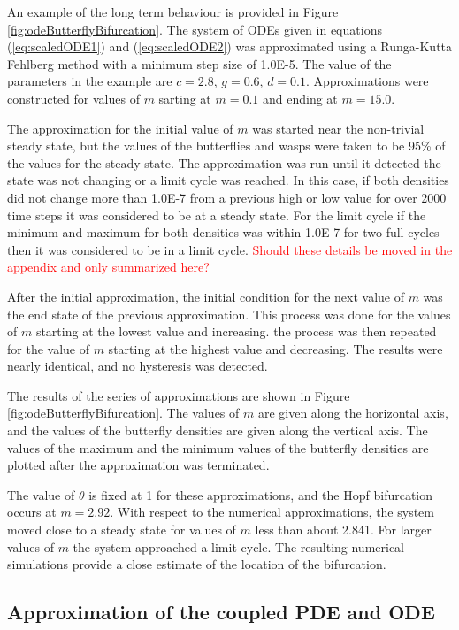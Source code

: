 \documentclass[review]{elsarticle}
\begin{document}
An example of the long term behaviour is provided in Figure
\ref{fig:odeButterflyBifurcation}. The system of ODEs given in
equations (\ref{eq:scaledODE1}) and (\ref{eq:scaledODE2}) was
approximated using a Runga-Kutta Fehlberg method with a minimum step
size of 1.0E-5.  The value of the parameters in the example are
$c=2.8$, $g=0.6$, $d=0.1$. Approximations were constructed for values
of $m$ sarting at $m=0.1$ and ending at $m=15.0$.

The approximation for the initial value of $m$ was started near the
non-trivial steady state, but the values of the butterflies and wasps
were taken to be 95\% of the values for the steady state. The
approximation was run until it detected the state was not changing or
a limit cycle was reached. In this case, if both densities did not
change more than 1.0E-7 from a previous high or low value for over
2000 time steps it was considered to be at a steady state. For the
limit cycle if the minimum and maximum for both densities was within
1.0E-7 for two full cycles then it was considered to be in a limit
cycle. \textcolor{red}{Should these details be moved in the appendix and only summarized here?}

After the initial approximation, the initial condition for the next
value of $m$ was the end state of the previous approximation. This
process was done for the values of $m$ starting at the lowest value
and increasing. the process was then repeated for the value of $m$
starting at the highest value and decreasing. The results were nearly
identical, and no hysteresis was detected.

The results of the series of approximations are shown in Figure
\ref{fig:odeButterflyBifurcation}. The values of $m$ are given along
the horizontal axis, and the values of the butterfly densities are
given along the vertical axis. The values of the maximum and the
minimum values of the butterfly densities are plotted after the
approximation was terminated.

The value of $\theta$ is fixed at 1 for these approximations, and the Hopf bifurcation occurs at $m=2.92$. With respect to the numerical approximations, the system moved close to a steady state for values of $m$ less than about 2.841. For larger values of $m$ the system approached a limit
cycle. The resulting numerical simulations provide a close estimate of the location of the bifurcation.

\subsection{Approximation of the coupled PDE and ODE}
\end{document}
